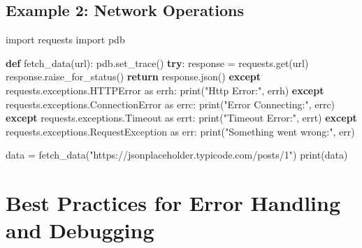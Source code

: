 \documentclass[
  letterpaper,
  DIV=11,
  numbers=noendperiod]{scrreprt}
\newenvironment{Shaded}{\begin{snugshade}}{\end{snugshade}}
\newcommand{\BuiltInTok}[1]{\textcolor[rgb]{0.00,0.23,0.31}{#1}}
\newcommand{\ControlFlowTok}[1]{\textcolor[rgb]{0.00,0.23,0.31}{\textbf{#1}}}
\newcommand{\ImportTok}[1]{\textcolor[rgb]{0.00,0.46,0.62}{#1}}
\newcommand{\KeywordTok}[1]{\textcolor[rgb]{0.00,0.23,0.31}{\textbf{#1}}}
\newcommand{\NormalTok}[1]{\textcolor[rgb]{0.00,0.23,0.31}{#1}}
\newcommand{\OperatorTok}[1]{\textcolor[rgb]{0.37,0.37,0.37}{#1}}
\newcommand{\PreprocessorTok}[1]{\textcolor[rgb]{0.68,0.00,0.00}{#1}}
\newcommand{\StringTok}[1]{\textcolor[rgb]{0.13,0.47,0.30}{#1}}
\begin{document}
\subsection{Example 2: Network
Operations}\label{example-2-network-operations}

\begin{Shaded}
\begin{Highlighting}[]
\ImportTok{import}\NormalTok{ requests}
\ImportTok{import}\NormalTok{ pdb}

\KeywordTok{def}\NormalTok{ fetch\_data(url):}
\NormalTok{    pdb.set\_trace()}
    \ControlFlowTok{try}\NormalTok{:}
\NormalTok{        response }\OperatorTok{=}\NormalTok{ requests.get(url)}
\NormalTok{        response.raise\_for\_status()}
        \ControlFlowTok{return}\NormalTok{ response.json()}
    \ControlFlowTok{except}\NormalTok{ requests.exceptions.HTTPError }\ImportTok{as}\NormalTok{ errh:}
        \BuiltInTok{print}\NormalTok{(}\StringTok{"Http Error:"}\NormalTok{, errh)}
    \ControlFlowTok{except}\NormalTok{ requests.exceptions.}\PreprocessorTok{ConnectionError} \ImportTok{as}\NormalTok{ errc:}
        \BuiltInTok{print}\NormalTok{(}\StringTok{"Error Connecting:"}\NormalTok{, errc)}
    \ControlFlowTok{except}\NormalTok{ requests.exceptions.Timeout }\ImportTok{as}\NormalTok{ errt:}
        \BuiltInTok{print}\NormalTok{(}\StringTok{"Timeout Error:"}\NormalTok{, errt)}
    \ControlFlowTok{except}\NormalTok{ requests.exceptions.RequestException }\ImportTok{as}\NormalTok{ err:}
        \BuiltInTok{print}\NormalTok{(}\StringTok{"Something went wrong:"}\NormalTok{, err)}

\NormalTok{data }\OperatorTok{=}\NormalTok{ fetch\_data(}\StringTok{"https://jsonplaceholder.typicode.com/posts/1"}\NormalTok{)}
\BuiltInTok{print}\NormalTok{(data)}
\end{Highlighting}
\end{Shaded}

\section{Best Practices for Error Handling and
Debugging}\label{best-practices-for-error-handling-and-debugging}
\end{document}
